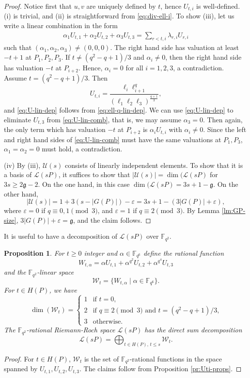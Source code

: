 \documentclass[a4paper]{amsart}
\theoremstyle{plain}
\newtheorem{proposition}[theorem]{Proposition}
\theoremstyle{definition}
\theoremstyle{remark}
\newcommand{\g}{\mathfrak{g}}
\begin{document}
\begin{proof}
Notice first that $u,v$ are uniquely defined by $t$, hence $U_{t,i}$ is well-defined. (i) is trivial, and (ii) is straightforward from \eqref{eq:div-ell-i}. To show (iii), let us write a linear combination in the form
\begin{align} \label{eq:U-lin-comb}
\alpha_1 U_{t,1}+\alpha_2 U_{t,2} + \alpha_3 U_{t,3} = \sum_{r<t, i} \lambda_{r,i} U_{r,i}
\end{align}
such that $(\alpha_1,\alpha_2,\alpha_3)\neq (0,0,0)$. The right hand side has valuation at least $-t+1$ at $P_1,P_2,P_3$. If $t\neq (q^2-q+1)/3$ and $\alpha_i\neq 0$, then the right hand side has valuation $-t$ at $P_{i+2}$. Hence, $\alpha_i=0$ for all $i=1,2,3$, a contradiction. Assume $t=(q^2-q+1)/3$. Then
\[U_{t,i}=\frac{\ell_i\ell_{i+1}^q}{(\ell_1\ell_2\ell_3)^\frac{q+1}{3}},\]
and \eqref{eq:U-lin-dep} follows from \eqref{eq:ell-q-lin-dep}. We can use \eqref{eq:U-lin-dep} to eliminate $U_{t,3}$ from \eqref{eq:U-lin-comb}, that is, we may assume $\alpha_3=0$. Then again, the only term which has valuation $-t$ at $P_{i+2}$ is $\alpha_iU_{t,i}$ with $\alpha_i\neq 0$. Since the left and right hand sides of \eqref{eq:U-lin-comb} must have the same valuations at $P_1,P_3$, $\alpha_1=\alpha_2=0$ must hold, a contradiction. 

(iv) By (iii), $\mathcal{U}(s)$ consists of linearly independent elements. To show that it is a basis of $\mathscr{L}(sP)$, it suffices to show that $|\mathcal{U}(s)|=\dim(\mathscr{L}(sP)$ for $3s\geq 2\g-2$. On the one hand, in this case $\dim(\mathscr{L}(sP) = 3s+1-\g$. On the other hand, 
\[|\mathcal{U}(s)|=1+3(s-|G(P)|)-\varepsilon = 3s+1-(3|G(P)|+\varepsilon),\]
where $\varepsilon=0$ if $q\equiv0,1\pmod3$, and $\varepsilon=1$ if $q\equiv 2\pmod3$. By Lemma \ref{lm:GP-size}, $3|G(P)|+\varepsilon = \g$, and the claim follows. 
\end{proof}

It is useful to have a decomposition of $\mathscr{L}(sP)$ over $\mathbb{F}_{q^2}$.

\begin{proposition} \label{pr:Wt-props}
For $t\geq 0$ integer and $\alpha \in \mathbb{F}_{q^6}$ define the rational function 
\[W_{t,\alpha} = \alpha U_{t,1} + \alpha^{q^2} U_{t,2} + \alpha^{q^4} U_{t,3}\]
and the $\mathbb{F}_{q^2}$-linear space
\[\mathcal{W}_t = \{W_{t,\alpha} \mid \alpha \in \mathbb{F}_{q^6}\}.\]
For $t\in H(P)$, we have
\[\dim(\mathcal{W}_t) = \begin{cases}
1 & \text{if $t=0$,} \\
2 & \text{if $q\equiv 2\pmod3$ and $t=(q^2-q+1)/3$,} \\
3 & \text{otherwise.}
\end{cases}\]
The $\mathbb{F}_{q^2}$-rational Riemann-Roch space $\mathscr{L}(sP)$ has the direct sum decomposition
\[\mathscr{L}(sP) = \bigoplus_{t\in H(P), \, t\leq s} \mathcal{W}_t.\]
\end{proposition}
\begin{proof}
For $t\in H(P)$, $\mathcal{W}_t$ is the set of $\mathbb{F}_{q^2}$-rational functions in the space spanned by $U_{t,1}, U_{t,2}, U_{t,3}$. The claims follow from Proposition \ref{pr:Uti-props}. 
\end{proof}
\end{document}

